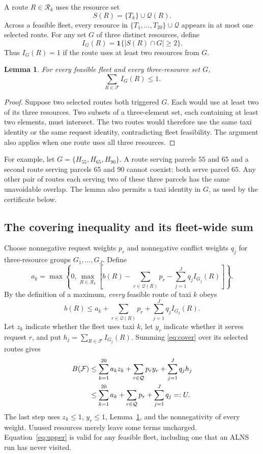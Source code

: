 \documentclass[11pt,a4paper]{article}
\newtheorem{lemma}{Lemma}
\newcommand{\R}{\mathcal R}
\newcommand{\Q}{\mathcal Q}
\newcommand{\F}{\mathcal F}
\newcommand{\ind}{\mathbf 1}
\begin{document}
A route $R\in\R_k$ uses the resource set
\[
 S(R)=\{T_k\}\cup\Q(R).
\]
Across a feasible fleet, every resource in
$\{T_1,\ldots,T_{20}\}\cup\Q$ appears in at most one selected route.
For any set $G$ of three distinct resources, define
\[
 I_G(R)=\ind\{|S(R)\cap G|\geq 2\}.
\]
Thus $I_G(R)=1$ if the route uses at least two resources from $G$.

\begin{lemma}\label{lem:triple}
For every feasible fleet and every three-resource set $G$,
\[
 \sum_{R\in\F}I_G(R)\leq 1.
\]
\end{lemma}
\begin{proof}
Suppose two selected routes both triggered $G$. Each would use at least two
of its three resources. Two subsets of a three-element set, each containing
at least two elements, must intersect. The two routes would therefore use
the same taxi identity or the same request identity, contradicting fleet
feasibility. The argument also applies when one route uses all three resources.
\end{proof}

For example, let $G=\{H_{55},H_{65},H_{90}\}$. A route serving parcels $55$
and $65$ and a second route serving parcels $65$ and $90$ cannot coexist:
both serve parcel $65$. Any other pair of routes each serving two of these
three parcels has the same unavoidable overlap. The lemma also permits a
taxi identity in $G$, as used by the certificate below.

\subsection{The covering inequality and its fleet-wide sum}

Choose nonnegative request weights $p_r$ and nonnegative conflict weights
$q_j$ for three-resource groups $G_1,\ldots,G_J$. Define
\begin{equation}\label{eq:residual}
 a_k=\max\left\{0,\max_{R\in\R_k}
 \left[b(R)-\sum_{r\in\Q(R)}p_r-\sum_{j=1}^Jq_j I_{G_j}(R)\right]\right\}.
\end{equation}
By the definition of a maximum, \emph{every} feasible route of taxi $k$ obeys
\begin{equation}\label{eq:cover}
 b(R)\leq a_k+\sum_{r\in\Q(R)}p_r+\sum_{j=1}^Jq_j I_{G_j}(R).
\end{equation}
Let $z_k$ indicate whether the fleet uses taxi $k$, let $y_r$ indicate whether
it serves request $r$, and put $h_j=\sum_{R\in\F}I_{G_j}(R)$. Summing
\eqref{eq:cover} over its selected routes gives
\begin{align}
 B(\F)
 &\leq\sum_{k=1}^{20}a_k z_k+\sum_{r\in\Q}p_r y_r+\sum_{j=1}^Jq_j h_j
 \notag\\
 &\leq\sum_{k=1}^{20}a_k+\sum_{r\in\Q}p_r+\sum_{j=1}^Jq_j=:U.\label{eq:upper}
\end{align}
The last step uses $z_k\leq1$, $y_r\leq1$, Lemma~\ref{lem:triple}, and the
nonnegativity of every weight. Unused resources merely leave some terms
uncharged. Equation~\eqref{eq:upper} is valid for any feasible fleet, including
one that an ALNS run has never visited.
\end{document}
